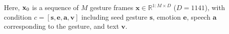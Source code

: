 %
%
%

Here, $\mathbf{x}_0$ is a sequence of $M$ gesture frames $\mathbf{x} \in \mathbb{R}^{1:M \times D}$ ($D = 1141$), with condition $c = [\mathbf{s}, \mathbf{e}, \mathbf{a}, \mathbf{v}]$ including seed gesture $\mathbf{s}$, emotion $\mathbf{e}$, speech $\mathbf{a}$ corresponding to the gesture, and text $\mathbf{v}$.

